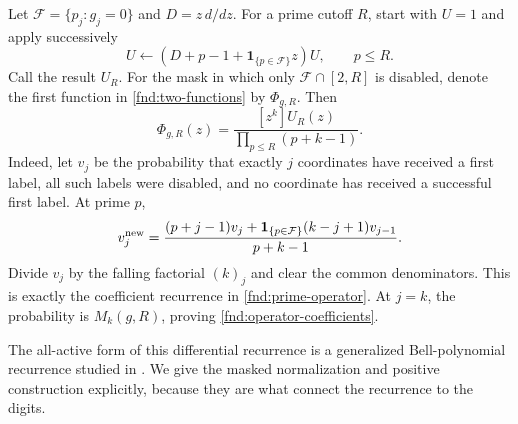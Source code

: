 Let $\mathcal F=\{p_j:g_j=0\}$ and $D=z\,d/dz$.
For a prime cutoff $R$, start with $U=1$ and apply successively
\begin{equation}
 U\longleftarrow(D+p-1+\mathbf1_{\{p\in\mathcal F\}}z)U,
 \qquad p\le R.
 \label{fnd:prime-operator}
\end{equation}
Call the result $U_R$.  For the mask in which only
$\mathcal F\cap[2,R]$ is disabled, denote the first function in
\eqref{fnd:two-functions} by $\Phi_{g,R}$.  Then
\begin{equation}
 [z^k]\Phi_{g,R}(z)=
 \frac{[z^k]U_R(z)}{\prod_{p\le R}(p+k-1)}.
 \label{fnd:operator-coefficients}
\end{equation}
Indeed, let $v_j$ be the probability that exactly $j$ coordinates
have received a first label, all such labels were disabled, and no
coordinate has received a successful first label.  At prime $p$,
\[
 v_j^{\rm new}=
 \frac{(p+j-1)v_j+
 \mathbf1_{\{p\in\mathcal F\}}(k-j+1)v_{j-1}}{p+k-1}.
\]
Divide $v_j$ by the falling factorial $(k)_j$ and clear the common
denominators.  This is exactly the coefficient recurrence in
\eqref{fnd:prime-operator}.  At $j=k$, the probability is
$M_k(g,R)$, proving \eqref{fnd:operator-coefficients}.

The all-active form of this differential recurrence is a generalized
Bell-polynomial recurrence studied in \cite{fndDuran2024}.  We give
the masked normalization and positive construction explicitly,
because they are what connect the recurrence to the digits.



